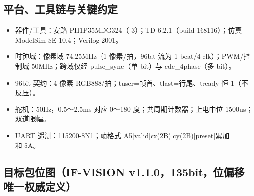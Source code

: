 \documentclass[10pt]{ctexart}
\begin{document}
\begin{center}
\end{center}

\subsection{平台、工具链与关键约定}

\begin{itemize}
  \item 器件/工具：安路 PH1P35MDG324（-3）；TD 6.2.1（build 168116）；仿真 ModelSim SE 10.4；Verilog-2001。
  \item 时钟域：像素域 74.25MHz（1 像素/拍，96bit 流为 1 beat/4 clk）；PWM/控制域 50MHz；跨域仅经 pulse\_sync（单 bit）与 cdc\_4phase（多 bit）。
  \item 96bit 契约：4 像素 RGB888/拍；tuser=帧首、tlast=行尾、tready 恒 1（不反压）。
  \item 舵机：50Hz，0.5～2.5ms 对应 0～180 度；共周期计数器；上电中位 1500us；双道限幅。
  \item UART 遥测：115200-8N1；帧格式 A5|valid|cx(2B)|cy(2B)|preset|累加和|5A。
\end{itemize}

\subsection{目标包位图（IF-VISION v1.1.0，135bit，位偏移唯一权威定义）}
\end{document}
